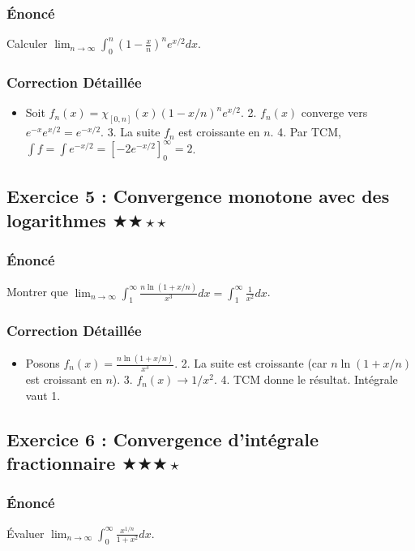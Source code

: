 \documentclass[11pt,a4paper]{article}
\begin{document}
\subsubsection*{Énoncé}
Calculer $\lim_{n \to \infty} \int_0^n (1-\frac{x}{n})^n e^{x/2} dx$.

\subsubsection*{Correction Détaillée}
\begin{itemize}
\item Soit $f_n(x) = \chi_{[0,n]}(x) (1-x/n)^n e^{x/2}$. 2. $f_n(x)$ converge vers $e^{-x} e^{x/2} = e^{-x/2}$. 3. La suite $f_n$ est croissante en $n$. 4. Par TCM, $\int f = \int e^{-x/2} = [-2e^{-x/2}]_0^\infty = 2$.
\end{itemize}

\subsection*{Exercice 5 : Convergence monotone avec des logarithmes \quad $\bigstar\bigstar\star\star$}

\subsubsection*{Énoncé}
Montrer que $\lim_{n \to \infty} \int_1^\infty \frac{n \ln(1+x/n)}{x^3} dx = \int_1^\infty \frac{1}{x^2} dx$.

\subsubsection*{Correction Détaillée}
\begin{itemize}
\item Posons $f_n(x) = \frac{n \ln(1+x/n)}{x^3}$. 2. La suite est croissante (car $n \ln(1+x/n)$ est croissant en $n$). 3. $f_n(x) \to 1/x^2$. 4. TCM donne le résultat. Intégrale vaut 1.
\end{itemize}

\subsection*{Exercice 6 : Convergence d'intégrale fractionnaire \quad $\bigstar\bigstar\bigstar\star$}

\subsubsection*{Énoncé}
Évaluer $\lim_{n \to \infty} \int_0^\infty \frac{x^{1/n}}{1+x^2} dx$.
\end{document}
